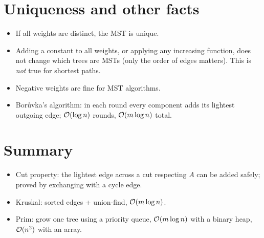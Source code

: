\section{Uniqueness and other facts}
\begin{itemize}
  \item If all weights are distinct, the MST is unique.
  \item Adding a constant to all weights, or applying any increasing function, does not change which trees are MSTs (only the order of edges matters).
        This is \emph{not} true for shortest paths.
  \item Negative weights are fine for MST algorithms.
  \item Bor\r{u}vka's algorithm: in each round every component adds its lightest outgoing edge; $\mathcal{O}(\log n)$ rounds, $\mathcal{O}(m\log n)$ total.
\end{itemize}

\section*{Summary}
\begin{itemize}
  \item Cut property: the lightest edge across a cut respecting $A$ can be added safely; proved by exchanging with a cycle edge.
  \item Kruskal: sorted edges + union-find, $\mathcal{O}(m\log n)$.
  \item Prim: grow one tree using a priority queue, $\mathcal{O}(m\log n)$ with a binary heap, $\mathcal{O}(n^2)$ with an array.
\end{itemize}
